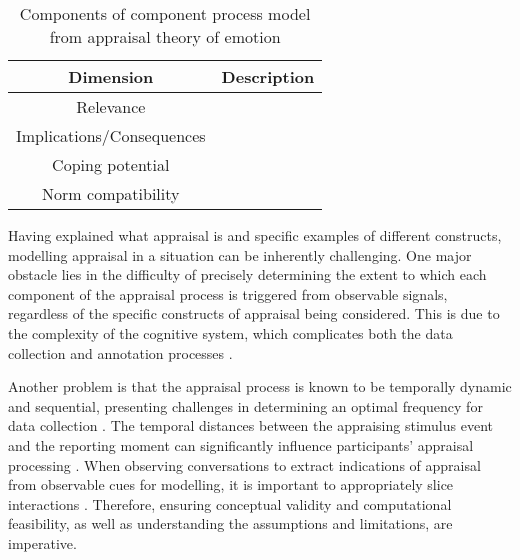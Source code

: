 
\begin{table}
    \centering
    \begin{tabular}{|c|l|} \hline
        Dimension & Description\\\hline
        Relevance  & \\
       Implications/Consequences  & \\
       Coping potential  & \\
       Norm compatibility  & \\ \hline
    \end{tabular}
    \caption{Components of component process model from appraisal theory of emotion  \cite{scherer2013nature}}
    \label{tab:emo_dimensions}
\end{table}


Having explained what appraisal is and specific examples of different constructs, modelling appraisal in a situation can be inherently challenging. One major obstacle lies in the difficulty of precisely determining the extent to which each component of the appraisal process is triggered from observable signals, regardless of the specific constructs of appraisal being considered. This is due to the complexity of the cognitive system, which complicates both the data collection and annotation processes \cite{sander2005systems}.


Another problem is that the appraisal process is known to be temporally dynamic and sequential, presenting challenges in determining an optimal frequency for data collection \cite{tekoppele2023we}. The temporal distances between the appraising stimulus event and the reporting moment can significantly influence participants' appraisal processing \cite{dudzik2023valid}. When observing conversations to extract indications of appraisal from observable cues for modelling, it is important to appropriately slice interactions \cite{murphy2021capturing}. Therefore, ensuring conceptual validity and computational feasibility, as well as understanding the assumptions and limitations, are imperative.

